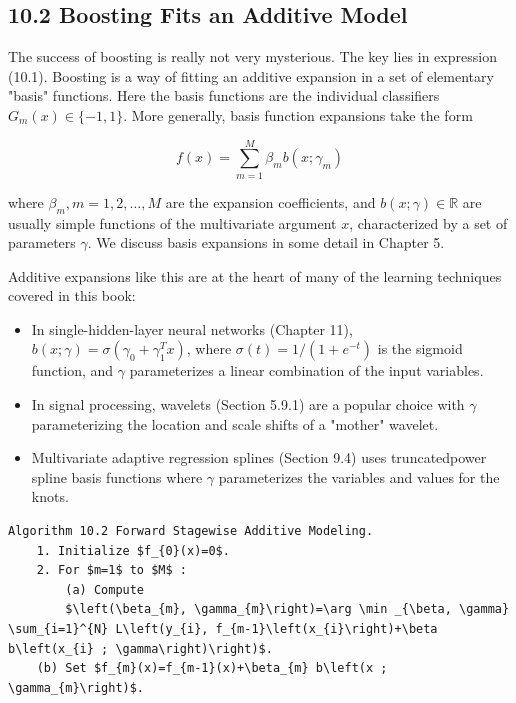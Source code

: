 \documentclass[10pt]{article}
\begin{document}
\subsection*{10.2 Boosting Fits an Additive Model}
The success of boosting is really not very mysterious. The key lies in expression (10.1). Boosting is a way of fitting an additive expansion in a set of elementary "basis" functions. Here the basis functions are the individual classifiers $G_{m}(x) \in\{-1,1\}$. More generally, basis function expansions take the form


\begin{equation*}
f(x)=\sum_{m=1}^{M} \beta_{m} b\left(x ; \gamma_{m}\right) \tag{10.3}
\end{equation*}


where $\beta_{m}, m=1,2, \ldots, M$ are the expansion coefficients, and $b(x ; \gamma) \in \mathbb{R}$ are usually simple functions of the multivariate argument $x$, characterized by a set of parameters $\gamma$. We discuss basis expansions in some detail in Chapter 5.

Additive expansions like this are at the heart of many of the learning techniques covered in this book:

\begin{itemize}
  \item In single-hidden-layer neural networks (Chapter 11), $b(x ; \gamma)=\sigma\left(\gamma_{0}+\right. \left.\gamma_{1}^{T} x\right)$, where $\sigma(t)=1 /\left(1+e^{-t}\right)$ is the sigmoid function, and $\gamma$ parameterizes a linear combination of the input variables.
  \item In signal processing, wavelets (Section 5.9.1) are a popular choice with $\gamma$ parameterizing the location and scale shifts of a "mother" wavelet.
  \item Multivariate adaptive regression splines (Section 9.4) uses truncatedpower spline basis functions where $\gamma$ parameterizes the variables and values for the knots.
\end{itemize}

\begin{verbatim}
Algorithm 10.2 Forward Stagewise Additive Modeling.
    1. Initialize $f_{0}(x)=0$.
    2. For $m=1$ to $M$ :
        (a) Compute
        $\left(\beta_{m}, \gamma_{m}\right)=\arg \min _{\beta, \gamma} \sum_{i=1}^{N} L\left(y_{i}, f_{m-1}\left(x_{i}\right)+\beta b\left(x_{i} ; \gamma\right)\right)$.
    (b) Set $f_{m}(x)=f_{m-1}(x)+\beta_{m} b\left(x ; \gamma_{m}\right)$.
\end{verbatim}
\end{document}
